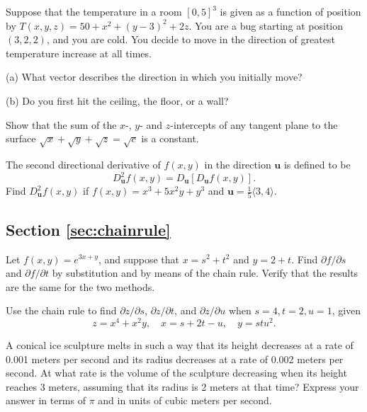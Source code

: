 \documentclass[svgnames]{watsonbook}
\begin{document}
\begin{exercise}{}{}
  Suppose that the temperature in a room $[0,5]^3$ is given as a
  function of position by $T(x,y,z) = 50 + x^2 + (y-3)^2 + 2z$. You
  are a bug starting at position $(3,2,2)$, and you are cold. You
  decide to move in the direction of greatest temperature increase at
  all times.

  (a) What vector describes the direction in which you initially move?

  (b) Do you first hit the ceiling, the floor, or a wall?
\end{exercise}

\begin{exercise}{}{}
  Show that the sum of the $x$-, $y$- and $z$-intercepts of any
  tangent plane to the surface
  $\sqrt{x} + \sqrt{y} + \sqrt{z} = \sqrt{c}$ is a constant.
\end{exercise}

\begin{exercise}{}{}
  The second directional derivative of $f(x,y)$ in the direction
  $\mathbf{u}$ is defined to be
  \[
    D_\mathbf{u}^2 f(x,y) = D_\mathbf{u}[D_{\mathbf{u}} f(x,y)].
  \]
  Find $D_\mathbf{u}^2 f(x,y)$ if $f(x,y) = x^3 + 5x^2y + y^3$ and
  $\mathbf{u} = \frac{1}{5}\langle 3,4\rangle$.
\end{exercise}



\subsection*{Section \ref{sec:chainrule}}

\begin{exercise}{}{}
  Let $f(x,y)=e^{3x+y}$, and suppose that $x=s^2+t^2$ and $y=2+t$. Find $\partial f/\partial s$ and $\partial f/\partial t$ by substitution and by means of the chain rule. Verify that the results are the same for the two methods. 
\end{exercise}


\begin{exercise}{}{}
  Use the chain rule to find $\partial z/\partial s$, $\partial
  z/\partial t$, and $\partial z/\partial u$ when $s=4, t = 2, u=1$, given 
  \[
    z = x^4 + x^2y, \quad x = s + 2t - u, \quad y = stu^2.
  \]
\end{exercise}

\begin{exercise}{}{}
  A conical ice sculpture melts in such a way that its height decreases at a rate of 0.001 meters per second and its radius decreases at a rate of 0.002 meters per second. At what rate is the volume of the sculpture decreasing when its height reaches 3 meters, assuming that its radius is 2 meters at that time? Express your answer in terms of $\pi$ and  in units of cubic meters per second. 
\end{exercise}
\end{document}

